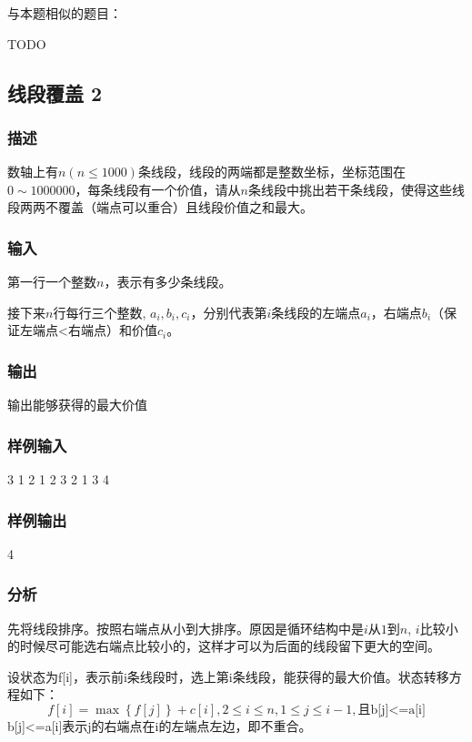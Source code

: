 与本题相似的题目：
\begindot
\item  TODO
\myenddot


\subsection{线段覆盖 2}

\subsubsection{描述}
数轴上有$n(n \leq 1000)$条线段，线段的两端都是整数坐标，坐标范围在$0 \sim 1000000$，每条线段有一个价值，请从$n$条线段中挑出若干条线段，使得这些线段两两不覆盖（端点可以重合）且线段价值之和最大。

\subsubsection{输入}
第一行一个整数$n$，表示有多少条线段。

接下来$n$行每行三个整数, $a_i,b_i,c_i$，分别代表第$i$条线段的左端点$a_i$，右端点$b_i$（保证左端点<右端点）和价值$c_i$。

\subsubsection{输出}
输出能够获得的最大价值

\subsubsection{样例输入}
\begin{Code}
3
1 2 1
2 3 2
1 3 4
\end{Code}

\subsubsection{样例输出}
\begin{Code}
4
\end{Code}

\subsubsection{分析}
先将线段排序。按照右端点从小到大排序。原因是循环结构中是$i$从$1$到$n$, $i$比较小的时候尽可能选右端点比较小的，这样才可以为后面的线段留下更大的空间。

设状态为f[i]，表示前i条线段时，选上第i条线段，能获得的最大价值。状态转移方程如下：
$$
f[i]=\max\left\{f[j]\right\}+c[i], 2 \leq i \leq n, 1 \leq j \leq i-1,\text{且b[j]<=a[i]}
$$
b[j]<=a[i]表示j的右端点在i的左端点左边，即不重合。

